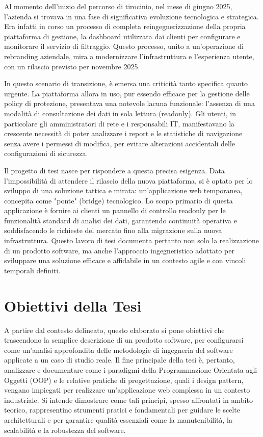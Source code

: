 \documentclass[12pt,a4paper,openright,twoside]{book}
\begin{document}
Al momento dell'inizio del percorso di tirocinio, nel mese di giugno 2025, l'azienda si trovava in una fase di significativa evoluzione tecnologica e strategica. Era infatti in corso un processo di completa reingegnerizzazione della propria piattaforma di gestione, la dashboard utilizzata dai clienti per configurare e monitorare il servizio di filtraggio. Questo processo, unito a un'operazione di rebranding aziendale, mira a modernizzare l'infrastruttura e l'esperienza utente, con un rilascio previsto per novembre 2025.

In questo scenario di transizione, è emersa una criticità tanto specifica quanto urgente. La piattaforma allora in uso, pur essendo efficace per la gestione delle policy di protezione, presentava una notevole lacuna funzionale: l'assenza di una modalità di consultazione dei dati in sola lettura (readonly). Gli utenti, in particolare gli amministratori di rete e i responsabili IT, manifestavano la crescente necessità di poter analizzare i report e le statistiche di navigazione senza avere i permessi di modifica, per evitare alterazioni accidentali delle configurazioni di sicurezza.

Il progetto di tesi nasce per rispondere a questa precisa esigenza. Data l'impossibilità di attendere il rilascio della nuova piattaforma, si è optato per lo sviluppo di una soluzione tattica e mirata: un'applicazione web temporanea, concepita come "ponte" (bridge) tecnologico. Lo scopo primario di questa applicazione è fornire ai clienti un pannello di controllo readonly per le funzionalità standard di analisi dei dati, garantendo continuità operativa e soddisfacendo le richieste del mercato fino alla migrazione sulla nuova infrastruttura. Questo lavoro di tesi documenta pertanto non solo la realizzazione di un prodotto software, ma anche l'approccio ingegneristico adottato per sviluppare una soluzione efficace e affidabile in un contesto agile e con vincoli temporali definiti.

\section*{Obiettivi della Tesi}
\label{sec:obiettivi_tesi}

A partire dal contesto delineato, questo elaborato si pone obiettivi che trascendono la semplice descrizione di un prodotto software, per configurarsi come un'analisi approfondita delle metodologie di ingegneria del software applicate a un caso di studio reale. Il fine principale della tesi è, pertanto, analizzare e documentare come i paradigmi della Programmazione Orientata agli Oggetti (OOP) e le relative pratiche di progettazione, quali i design pattern, vengano impiegati per realizzare un'applicazione web complessa in un contesto industriale. Si intende dimostrare come tali principi, spesso affrontati in ambito teorico, rappresentino strumenti pratici e fondamentali per guidare le scelte architetturali e per garantire qualità essenziali come la manutenibilità, la scalabilità e la robustezza del software.
\end{document}
